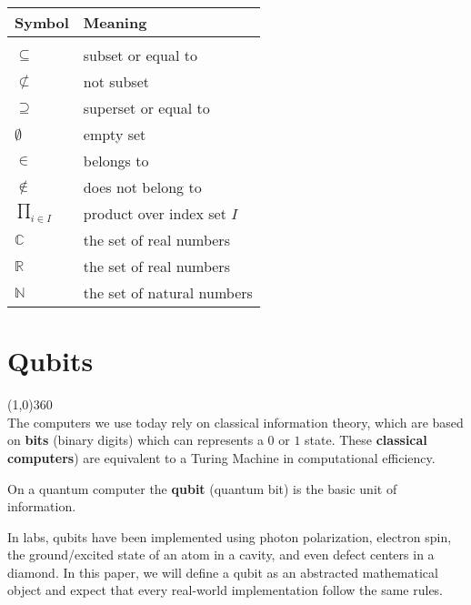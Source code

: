\documentclass[12pt,twoside]{report}
\theoremstyle{thmstyle}
\begin{document}
\begin{tabular}{p{2cm}p{5cm}}
\textbf{Symbol} & \textbf{Meaning}\\
\hline
& \\
$\subseteq$ & subset or equal to \\%
$\not\subset$ & not subset\\%
$\supseteq$ & superset or equal to \\
$\emptyset$ & empty set\\%
$\in$ & belongs to\\%
$\not \in $ & does not belong to \\
$\displaystyle\prod_{i \in I}$ & product over index set $I$ \\
$\mathbb{C}$ & the set of real numbers\\%
$\mathbb{R}$ & the set of real numbers\\%
$\mathbb{N}$ & the set of natural numbers\\%
\end{tabular}

\tableofcontents
\newpage
{}

\chapter{Qubits}

\line(1,0){360} \\

The computers we use today rely on classical information theory, which are based on \textbf{bits} (binary digits) which can represents a $0$ or $1$ state. These \textbf{classical computers}) are equivalent to a Turing Machine in computational efficiency. 

On a quantum computer the \textbf{qubit} (quantum bit) is the basic unit of information.

In labs, qubits have been implemented using photon polarization, electron spin, the ground/excited state of an atom in a cavity, and even defect centers in a diamond. In this paper, we will define a qubit as an abstracted mathematical object and expect that every real-world implementation follow the same rules.
\end{document}
